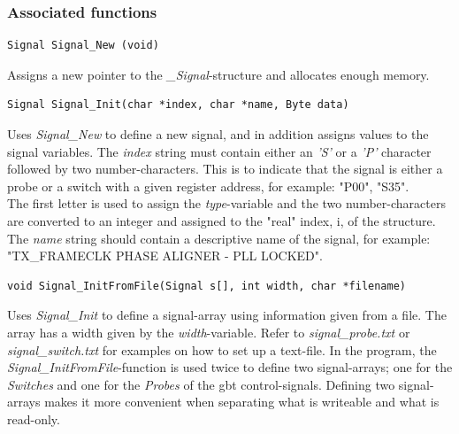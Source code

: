 \documentclass[main.tex]{subfiles}
\begin{document}
\subsubsection{Associated functions}


\begin{lstlisting}[frame=single] 
Signal Signal_New (void)
\end{lstlisting}
Assigns a new pointer to the \textit{\_Signal}-structure and allocates enough memory.\\

\begin{lstlisting}[frame=single] 
Signal Signal_Init(char *index, char *name, Byte data)
\end{lstlisting}
Uses \textit{Signal\_New} to define a new signal, and in addition assigns values to the signal variables. The \textit{index} string must contain either an \textit{'S'} or a \textit{'P'} character followed by two number-characters. This is to indicate that the signal is either a probe or a switch with a given register address, for example: "P00", "S35".\\ 
The first letter is used to assign the \textit{type}-variable and the two number-characters are converted to an integer and assigned to the "real" index, i, of the structure. The \textit{name} string should contain a descriptive name of the signal, for example: "TX\_FRAMECLK PHASE ALIGNER - PLL LOCKED".\\

\begin{lstlisting}[frame=single] 
void Signal_InitFromFile(Signal s[], int width, char *filename)
\end{lstlisting}
Uses \textit{Signal\_Init} to define a signal-array using information given from a file. The array has a width given by the \textit{width}-variable. Refer to \textit{signal\_probe.txt} or \textit{signal\_switch.txt} for examples on how to set up a text-file. In the program, the \textit{Signal\_InitFromFile}-function is used twice to define two signal-arrays; one for the \textit{Switches} and one for the \textit{Probes} of the \gls{gbt} control-signals. Defining two signal-arrays makes it more convenient when separating what is writeable and what is read-only.\\
\end{document}
